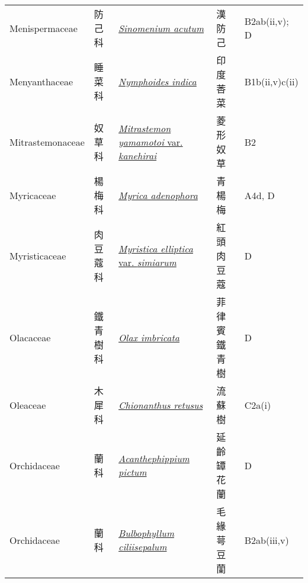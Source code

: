 {\begin{longtable}{L{2.5cm}L{2cm}L{5cm}L{2.5cm}L{3cm}}
    Menispermaceae & 防己科 & \href{http://www.theplantlist.org/tpl1.1/search?q=Sinomenium+acutum}{\textit{Sinomenium acutum} } & 漢防己 & B2ab(ii,v); D    \\
    Menyanthaceae & 睡菜科 & \href{http://www.theplantlist.org/tpl1.1/search?q=Nymphoides+indica}{\textit{Nymphoides indica} } & 印度莕菜 & B1b(ii,v)c(ii)    \\
    Mitrastemonaceae & 奴草科 & \href{http://www.theplantlist.org/tpl1.1/search?q=Mitrastemon+yamamotoi+var.+kanehirai}{\textit{Mitrastemon yamamotoi} var. \textit{kanehirai} } & 菱形奴草 & B2    \\
    Myricaceae & 楊梅科 & \href{http://www.theplantlist.org/tpl1.1/search?q=Myrica+adenophora}{\textit{Myrica adenophora} } & 青楊梅 & A4d, D    \\
    Myristicaceae & 肉豆蔻科 & \href{http://www.theplantlist.org/tpl1.1/search?q=Myristica+elliptica+var.+simiarum}{\textit{Myristica elliptica} var. \textit{simiarum} } & 紅頭肉豆蔻 & D    \\
    Olacaceae & 鐵青樹科 & \href{http://www.theplantlist.org/tpl1.1/search?q=Olax+imbricata}{\textit{Olax imbricata} } & 菲律賓鐵青樹 & D    \\
    Oleaceae & 木犀科 & \href{http://www.theplantlist.org/tpl1.1/search?q=Chionanthus+retusus}{\textit{Chionanthus retusus} } & 流蘇樹 & C2a(i)    \\
    Orchidaceae & 蘭科 & \href{http://www.theplantlist.org/tpl1.1/search?q=Acanthephippium+pictum}{\textit{Acanthephippium pictum} } & 延齡罈花蘭 & D    \\
    Orchidaceae & 蘭科 & \href{http://www.theplantlist.org/tpl1.1/search?q=Bulbophyllum+ciliisepalum}{\textit{Bulbophyllum ciliisepalum} } & 毛緣萼豆蘭 & B2ab(iii,v)    \\

\end{longtable}}
